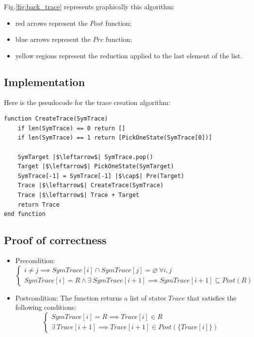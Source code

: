 \documentclass[12pt]{article}
\begin{document}
    Fig.\ref{fig:back_trace} represents graphically this algorithm:
    \begin{itemize}
        \item red arrows represent the $Post$ function;
        \item blue arrows represent the $Pre$ function;
        \item yellow regions represent the reduction applied to the last element of the list.
    \end{itemize}

    \subsection{Implementation}
    Here is the pseudocode for the trace creation algorithm:
    \begin{verbatim}
function CreateTrace(SymTrace)
    if len(SymTrace) == 0 return []
    if len(SymTrace) == 1 return [PickOneState(SymTrace[0])]

    SymTarget |$\leftarrow$| SymTrace.pop()
    Target |$\leftarrow$| PickOneState(SymTarget)
    SymTrace[-1] = SymTrace[-1] |$\cap$| Pre(Target)
    Trace |$\leftarrow$| CreateTrace(SymTrace)
    Trace |$\leftarrow$| Trace + Target
    return Trace
end function
    \end{verbatim}
    
    \subsection{Proof of correctness}
    \begin{itemize}
        \item Precondition:
        \begin{equation}
            \begin{cases}
                i \neq j \implies SymTrace[i] \cap SymTrace[j] = \varnothing\ \forall i, j \\
                SymTrace[i] = R \wedge \exists\ SymTrace[i+1] \implies SymTrace[i+1] \subseteq Post(R)
            \end{cases}
        \end{equation}
        \item Postcondition: The function returns a list of states $Trace$ that satisfies the following conditions:
        \begin{equation}
            \begin{cases}
                SymTrace[i] = R \implies Trace[i] \in R \\
                \exists\ Trace[i+1] \implies Trace[i+1] \in Post(\{Trace[i]\})
            \end{cases}
        \end{equation}
    \end{itemize}
\end{document}

